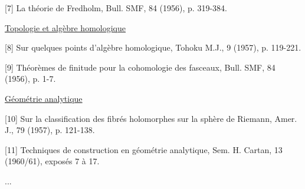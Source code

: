 [7] La théorie de Fredholm, Bull. SMF, 84 (1956), p. 319-384.

\uline{Topologie et algèbre homologique}

[8] Sur quelques points d'algèbre homologique, Tohoku M.J.,
9 (1957), p. 119-221.

[9] Théorèmes de finitude pour la cohomologie des fasceaux,
Bull. SMF, 84 (1956), p. 1-7.

\uline{Géométrie analytique}

[10] Sur la classification des fibrés holomorphes sur la
sphère de Riemann, Amer. J., 79 (1957), p. 121-138.

[11] Techniques de construction en géométrie analytique,
Sem. H. Cartan, 13 (1960/61), exposés 7 à 17.

...

